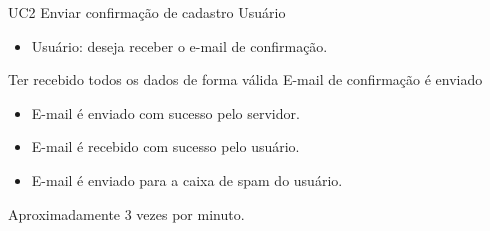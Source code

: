 
\casoDeUso
{UC2}
{Enviar confirmação de cadastro}
{Usuário}
{
\begin{itemize}
	\item Usuário: deseja receber o e-mail de confirmação.
\end{itemize}

}
{Ter recebido todos os dados de forma válida}
{E-mail de confirmação é enviado}
{
\begin{itemize}
	\item E-mail é enviado com sucesso pelo servidor.
	\item E-mail é recebido com sucesso pelo usuário.	
\end{itemize}
}
{
\begin{itemize}
\item E-mail é enviado para a caixa de spam do usuário.
\end{itemize}
}
{Aproximadamente 3 vezes por  minuto.}
{
 
}


